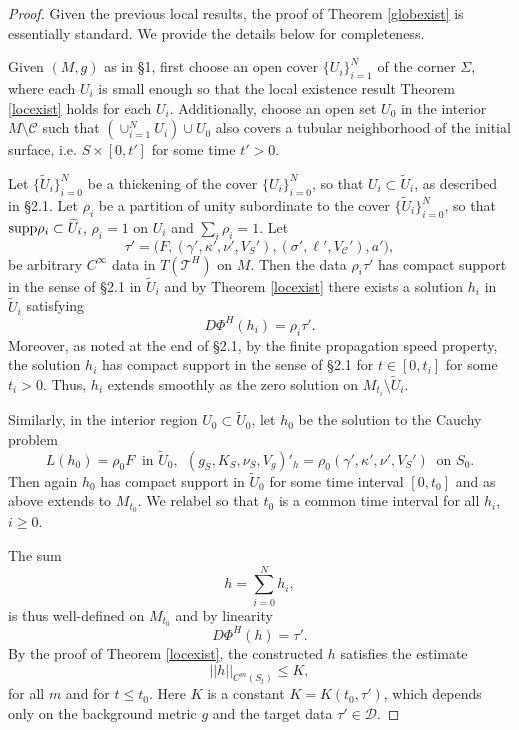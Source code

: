 \documentclass[10pt]{amsart}
\newcommand{\g}{\gamma}
\newcommand{\s}{\sigma}
\newcommand{\Si}{\Sigma}
\renewcommand{\k}{\kappa}
\newcommand{\cC}{{\mathcal C}}
\newcommand{\cT}{{\mathcal T}}
\newcommand{\cD}{{\mathcal D}}
\newcommand{\be}{\begin{equation}}
\newcommand{\ee}{\end{equation}}
\newcommand{\<}{\langle}
\renewcommand{\>}{\rangle}
\newcommand{\w}{\widetilde}
\theoremstyle{plain}
\theoremstyle{remark}
\theoremstyle{definition}
\numberwithin{equation}{section}
\begin{document}
 \begin{proof}

  Given the previous local results, the proof of Theorem \ref{globexist} is essentially standard. We provide the details below for completeness. 
    
  Given $(M, g)$ as in \S 1, first choose an open cover $\{U_i\}_{i=1}^N$ of the corner $\Si$, where each $U_i$ is small enough so that the local 
existence result Theorem \ref{locexist} holds for each $U_i$. Additionally, choose an open set $U_0$ in the interior $M\setminus \cC$ such that 
$(\cup_{i=1}^N U_i)\cup U_0$ also covers a tubular neighborhood of the initial surface, i.e. $S\times [0,t']$ for some time $t'>0$.

Let $\{\w U_i\}_{i=0}^N$ be a thickening of the cover $\{U_i\}_{i=0}^N$, so that $U_i \subset \w U_i$, as described in \S 2.1. Let 
$\rho_i$ be a partition of unity subordinate to the cover $\{\w U_i\}_{i=0}^N$, so that ${\rm supp}\rho_i\subset \w U_i$, $\rho_i = 1$ on 
$U_i$ and  $\sum_i \rho_i=1$. Let 
$$\tau' =\big(F, (\g', \k', \nu', V_S'), (\s', \ell',V_{\cC}'), a' \big),$$
be arbitrary $C^{\infty}$ data in $T(\cT^H)$ on $M$. Then the data $\rho_i \tau'$ has compact support in the sense of \S 2.1 in $\w U_i$ 
and by Theorem \ref{locexist} there exists a solution $h_i$ in $\w U_i$ satisfying 
$$D\Phi^H(h_i) = \rho_i \tau'.$$ 
Moreover, as noted at the end of \S 2.1, by the finite propagation speed property, the solution $h_i$ has compact support in the sense of \S 2.1 for 
$t \in [0,t_i]$ for some $t_i > 0$. Thus, $h_i$ extends smoothly as the zero solution on $M_{t_i} \setminus \w U_i$. 

   Similarly, in the interior region $U_0 \subset \w U_0$, let $h_0$ be the solution to the Cauchy problem 
$$L(h_0) = \rho_0 F \ \mbox{ in } \w U_0, \ \ (g_S, K_S, \nu_S, V_g)'_h = \rho_0(\g', \k', \nu', V_S') \ \mbox{ on }S_0.$$
Then again $h_0$ has compact support in $\w U_0$ for some time interval $[0, t_0]$ and as above extends to $M_{t_0}$. We relabel so that 
$t_0$ is a common time interval for all $h_i$, $i \geq 0$. 

  The sum 
$$h = \sum_{i=0}^N h_i,$$
is thus well-defined on $M_{t_0}$ and by linearity
$$D\Phi^H(h) = \tau'.$$ 
By the proof of Theorem \ref{locexist}, the constructed $h$ satisfies the estimate
\be \label{enest2}
||h||_{C^{m}(S_t)} \leq K,
\ee
for all $m$ and for $t \leq t_0$. Here $K$ is a constant $K = K(t_0, \tau')$, which depends only on the background metric $g$ and the 
target data $\tau' \in \cD$. 


\end{proof}
\end{document}
